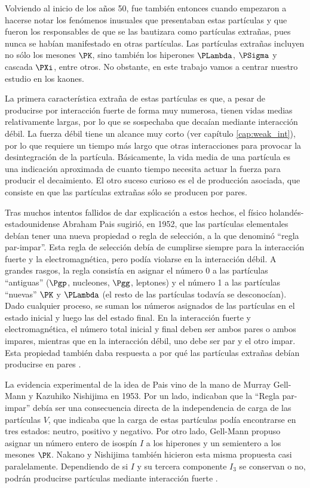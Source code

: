 Volviendo al inicio de los años 50, fue también entonces cuando empezaron a hacerse notar los fenómenos inusuales que presentaban estas partículas y que fueron los responsables de que se las bautizara como partículas extrañas, pues nunca se habían manifestado en otras partículas. Las partículas extrañas incluyen no sólo los mesones $\PK$, sino también los hiperones $\PLambda$, $\PSigma$ y cascada $\PXi$, entre otros. No obstante, en este trabajo vamos a centrar nuestro estudio en los kaones.

La primera característica extraña de estas partículas es que, a pesar de producirse por interacción fuerte de forma muy numerosa, tienen vidas medias relativamente largas, por lo que se sospechaba que decaían mediante interacción débil. La fuerza débil tiene un alcance muy corto (ver capítulo \ref{cap:weak_int}), por lo que requiere un tiempo más largo que otras interacciones para provocar la desintegración de la partícula. Básicamente, la vida media de una partícula es una indicación aproximada de cuanto tiempo necesita actuar la fuerza para producir el decaimiento. El otro suceso curioso es el de producción asociada, que consiste en que las partículas extrañas sólo se producen por pares.  

Tras muchos intentos fallidos de dar explicación a estos hechos, el físico holandés-estadounidense Abraham Pais sugirió, en 1952, que las partículas elementales debían tener una nueva propiedad o regla de selección, a la que denominó ``regla par-impar''. Esta regla de selección debía de cumplirse siempre para la interacción fuerte y la electromagnética, pero podía violarse en la interacción débil. A grandes rasgos, la regla consistía en asignar el número 0 a las partículas ``antiguas'' ($\Pgp$, nucleones, $\Pgg$, leptones) y el número 1 a las partículas ``nuevas'' $\PK$ y $\PLambda$ (el resto de las partículas todavía se desconocían). Dado cualquier proceso, se suman los números asignados de las partículas en el estado inicial y luego las del estado final. En la interacción fuerte y electromagnética, el número total inicial y final deben ser ambos pares o ambos impares, mientras que en la interacción débil, uno debe ser par y el otro impar. Esta propiedad también daba respuesta a por qué las partículas extrañas debían producirse en pares \cite{Pais}.

La evidencia experimental de la idea de Pais vino de la mano de Murray Gell-Mann y Kazuhiko Nishijima en 1953. Por un lado, indicaban que la ``Regla par-impar'' debía ser una consecuencia directa de la independencia de carga de las partículas $V$, que indicaba que la carga de estas partículas podía encontrarse en tres estados: neutro, positivo y negativo. Por otro lado, Gell-Mann propuso asignar un número entero de isospín $I$ a los hiperones y un semientero a los mesones $\PK$. Nakano y Nishijima también hicieron esta misma propuesta casi paralelamente. Dependiendo de si $I$ y su tercera componente $I_3$ se conservan o no, podrán producirse partículas mediante interacción fuerte \cite{nakano}.

